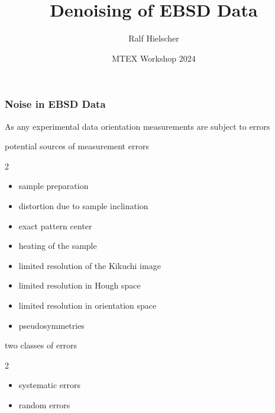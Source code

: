 \documentclass[compress,aspectratio=1610,fleqn]{beamer}
\author{Ralf Hielscher}
\title{Denoising of EBSD Data}
\institute{Faculty of Mathematics and Computer Science,\\
	TU Bergakademie Freiberg, Germany}
\date{MTEX Workshop 2024}
\begin{document}
\begin{frame}
  \maketitle{}
\end{frame}




\begin{frame}[fragile]
  \frametitle{Noise in EBSD Data}

  As any experimental data orientation measurements are subject to errors

  \begin{block}{potential sources of measurement errors}
    \begin{multicols}{2}
      \begin{itemize}
      \item sample preparation
      \item distortion due to sample inclination
      \item exact pattern center
      \item heating of the sample
      \item limited resolution of the Kikuchi image
      \item limited resolution in Hough space
      \item limited resolution in orientation space
      \item pseudosymmetries
      \end{itemize}
    \end{multicols}
   \end{block}

   \bigskip

   
   \begin{block}{two classes of errors}     
     \begin{multicols}{2}
       \begin{itemize}
       \item systematic errors
       \item random errors
       \end{itemize}
     \end{multicols}
  \end{block}


\end{frame}
\end{document}
